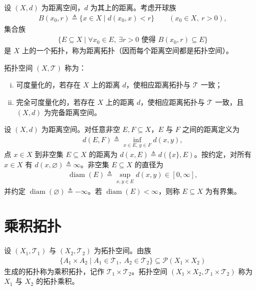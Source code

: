 \documentclass[../main.tex]{subfiles}
\begin{document}
\begin{definition}[距离拓扑]\label{definition:appA-距离拓扑}
设 $(X,d)$ 为距离空间，$d$ 为其上的距离。考虑开球族
\begin{align*}
B(x_0,r)\triangleq \{x\in X\mid d(x_0,x)<r\}\qquad(x_0\in X,\ r>0),
\end{align*}
集合族
\begin{align*}
\{E\subseteq X\mid \forall x_0\in E,\ \exists r>0\text{ 使得 }B(x_0,r)\subseteq E\}
\end{align*}
是 $X$ 上的一个拓扑，称为距离拓扑（因而每个距离空间都是拓扑空间）。
\end{definition}

\begin{definition}[可度量化]\label{definition:appA-可度量化}\label{proposition:appA-可度量化}
拓扑空间 $(X,\mathscr{T})$ 称为：
\begin{enumerate}[(i)]
\item 可度量化的，若存在 $X$ 上的距离 $d$，使相应距离拓扑与 $\mathscr{T}$ 一致；
\item 完全可度量化的，若存在 $X$ 上的距离 $d$，使相应距离拓扑与 $\mathscr{T}$ 一致，且 $(X,d)$ 为完备距离空间。
\end{enumerate}
\end{definition}

\begin{definition}\label{definition:appA-距离直径}
设 $(X,d)$ 为距离空间。对任意非空 $E,F\subseteq X$，$E$ 与 $F$ 之间的距离定义为
\begin{align*}
d(E,F)\triangleq \inf_{x\in E,\,y\in F}d(x,y),
\end{align*}
点 $x\in X$ 到非空集 $E\subseteq X$ 的距离为 $d(x,E)\triangleq d(\{x\},E)$。按约定，对所有 $x\in X$ 有 $d(x,\varnothing )\triangleq \infty$。非空集 $E\subseteq X$ 的直径为
\begin{align*}
\operatorname{diam}(E)\triangleq \sup_{x,y\in E}d(x,y)\in[0,\infty],
\end{align*}
并约定 $\operatorname{diam}(\varnothing )\triangleq -\infty$。若 $\operatorname{diam}(E)<\infty$，则称 $E\subseteq X$ 为有界集。
\end{definition}

\section{乘积拓扑}\label{section:appA-乘积拓扑}

\begin{definition}[乘积拓扑]\label{definition:appA-乘积拓扑}
设 $(X_1,\mathscr{T}_1)$ 与 $(X_2,\mathscr{T}_2)$ 为拓扑空间。由族
\begin{align*}
\{A_1\times A_2\mid A_1\in\mathscr{T}_1,\ A_2\in\mathscr{T}_2\}\subseteq\mathcal{P}(X_1\times X_2)
\end{align*}
生成的拓扑称为乘积拓扑，记作 $\mathscr{T}_1\times\mathscr{T}_2$。拓扑空间 $(X_1\times X_2,\mathscr{T}_1\times\mathscr{T}_2)$ 称为 $X_1$ 与 $X_2$ 的拓扑乘积。
\end{definition}
\end{document}
